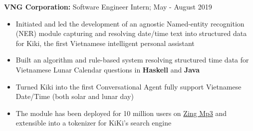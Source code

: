 \documentclass[a4paper,11pt]{article}
\begin{document}
\begin{flushleft}
	
	\textbf{VNG Corporation: }Software Engineer Intern; May - August 2019 \\
	\vspace{-\topsep}
	\begin{itemize}
		\setlength{\parskip}{2pt}
		\setlength{\itemsep}{0pt plus 1pt}
		\item Initiated and led the development of an agnostic Named-entity recognition (NER) module capturing and resolving date/time text into structured data for Kiki, the first Vietnamese intelligent personal assistant
		\item Built an algorithm and rule-based system resolving structured time data for Vietnamese Lunar Calendar questions in \textbf{Haskell} and \textbf{Java}  
		\item Turned Kiki into the first Conversational Agent fully support Vietnamese Date/Time (both solar and lunar day) 
		\item  The module has been deployed for 10 million users on \href{https://mp3.zing.vn/}{Zing Mp3} and extensible into a tokenizer for KiKi's search engine
	\end{itemize}
\vspace{-\topsep}
\centering{\noindent\makebox{\rule{8cm}{1.5pt}}}
\end{flushleft} 
\end{document}
